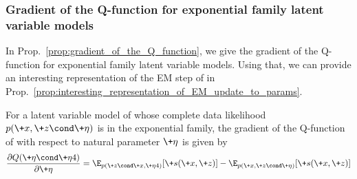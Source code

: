 \documentclass{article} %
\newcommand{\sufficientStatsFunction}{\+s}
\newcommand{\naturalParam}{\+\eta}
\begin{document}
    



\subsubsection{Gradient of the Q-function for exponential family latent variable models}

 In Prop.~\ref{prop:gradient_of_the_Q_function}, we give the gradient of the Q-function for exponential family latent variable models. Using that, we can provide an interesting representation of the EM step of  in Prop.~\ref{prop:interesting_representation_of_EM_update_to_params}. 


\begin{proposition}
For a latent variable model of   whose complete data likelihood  $p(\+x, \+z \cond \naturalParam)$ is in the exponential family, the gradient of the Q-function of  with respect to natural parameter $\naturalParam$ is given by 
 \begin{align}
 \frac{\partial Q(\naturalParam \cond \naturalParam^^t)}{\partial \naturalParam} =  \E_{p(\+z \cond \+x, \naturalParam^^t)}[\sufficientStatsFunction(\+x,\+z)] - 	\E_{p(\+x, \+z \cond \naturalParam)}[\sufficientStatsFunction(\+x,\+z)]
 \label{eqn:gradient_of_Q_function_for_EM}
 \end{align}
%
\label{prop:gradient_of_the_Q_function}
 \end{proposition}
\end{document}
